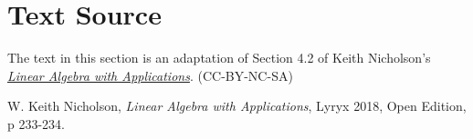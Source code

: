 \documentclass{ximera}
\begin{document}
\section*{Text Source}
The text in this section is an adaptation of Section 4.2 of Keith Nicholson's \href{https://open.umn.edu/opentextbooks/textbooks/linear-algebra-with-applications}{\it Linear Algebra with Applications}. (CC-BY-NC-SA)

W. Keith Nicholson, {\it Linear Algebra with Applications}, Lyryx 2018, Open Edition, p 233-234.
\end{document}
